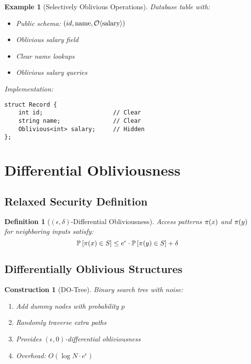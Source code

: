 \documentclass[11pt,final]{article}
\newtheorem{definition}[theorem]{Definition}
\newtheorem{example}[theorem]{Example}
\newtheorem{construction}[theorem]{Construction}
\begin{document}
\begin{example}[Selectively Oblivious Operations]
Database table with:
\begin{itemize}
    \item Public schema: $(id, \text{name}, \mathcal{O}\langle \text{salary} \rangle)$
    \item Oblivious salary field
    \item Clear name lookups
    \item Oblivious salary queries
\end{itemize}
Implementation:
\begin{verbatim}
struct Record {
    int id;                    // Clear
    string name;               // Clear
    Oblivious<int> salary;     // Hidden
};
\end{verbatim}
\end{example}

\section{Differential Obliviousness}

\subsection{Relaxed Security Definition}

\begin{definition}[$(\epsilon, \delta)$-Differential Obliviousness]
Access patterns $\pi(x)$ and $\pi(y)$ for neighboring inputs satisfy:
\begin{equation}
\mathbb{P}\left[\pi(x) \in S\right] \leq e^\epsilon \cdot \mathbb{P}\left[\pi(y) \in S\right] + \delta
\end{equation}
\end{definition}

\subsection{Differentially Oblivious Structures}

\begin{construction}[DO-Tree]
Binary search tree with noise:
\begin{enumerate}
    \item Add dummy nodes with probability $p$
    \item Randomly traverse extra paths
    \item Provides $(\epsilon, 0)$-differential obliviousness
    \item Overhead: $O(\log N \cdot e^\epsilon)$
\end{enumerate}
\end{construction}
\end{document}
